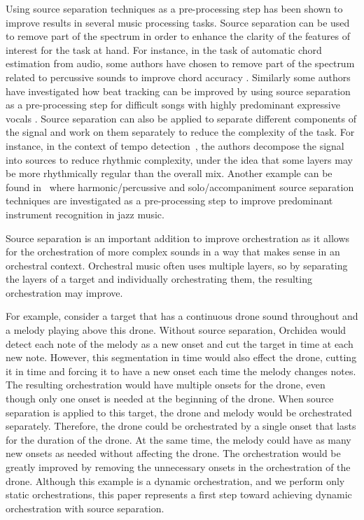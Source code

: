 \documentclass{article}
\begin{document}
	Using source separation techniques as a pre-processing step has been shown to improve results in several music processing tasks. Source separation can be used to remove part of the spectrum in order to enhance the clarity of the features of interest for the task at hand. For instance, in the task of automatic chord estimation from audio, some authors have chosen to remove part of the spectrum related to percussive sounds to improve chord accuracy \cite{Reed_al2009}. Similarly some authors have investigated how beat tracking can be improved by using source separation as a pre-processing step for difficult songs with highly predominant expressive vocals \cite{ZapGom2012}. Source separation can also be applied to separate different components of the signal and work on them separately to reduce the complexity of the task. For instance, in the context of tempo detection~\cite{ChoRae2009}, the authors decompose the signal into sources to reduce rhythmic complexity, under the idea that some layers may be more rhythmically regular than the overall mix. Another example can be found in~\cite{GomAbecan2018} where harmonic/percussive and solo/accompaniment source separation techniques are investigated as a pre-processing step to improve predominant instrument recognition in jazz music.
		
	Source separation is an important addition to improve orchestration as it allows for the orchestration of more complex sounds in a way that makes sense in an orchestral context. Orchestral music often uses multiple layers, so by separating the layers of a target and individually orchestrating them, the resulting orchestration may improve. 
		
	For example, consider a target that has a continuous drone sound throughout and a melody playing above this drone. Without source separation, Orchidea would detect each note of the melody as a new onset and cut the target in time at each new note. However, this segmentation in time would also effect the drone, cutting it in time and forcing it to have a new onset each time the melody changes notes. The resulting orchestration would have multiple onsets for the drone, even though only one onset is needed at the beginning of the drone. When source separation is applied to this target, the drone and melody would be orchestrated separately. Therefore, the drone could be orchestrated by a single onset that lasts for the duration of the drone. At the same time, the melody could have as many new onsets as needed without affecting the drone. The orchestration would be greatly improved by removing the unnecessary onsets in the orchestration of the drone. Although this example is a dynamic orchestration, and we perform only static orchestrations, this paper represents a first step toward achieving dynamic orchestration with source separation.
		
\end{document}
